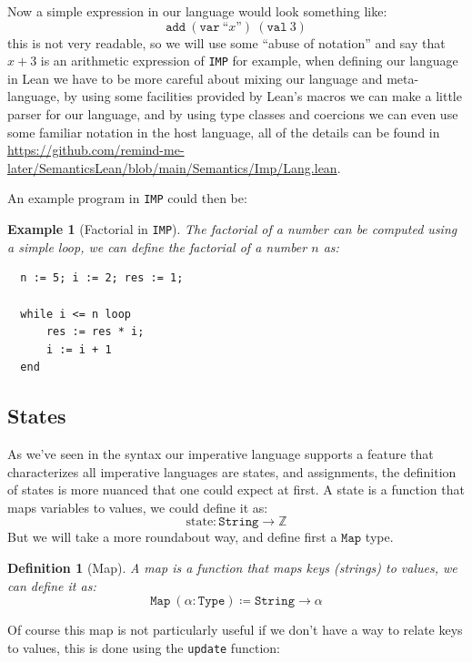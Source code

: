 \documentclass[
  a4paper, 
  10pt, 
  parskip=half, 
  DIV=20,
  toc=bibliography,
  usegeometry,
]{scrartcl}
\newtheorem{definition}[theorem]{Definition}
\newtheorem{example}[theorem]{Example}
\newcommand{\funfont}[1]{\text{#1}}
\newcommand{\tyfont}[1]{\texttt{#1}}
\begin{document}
Now a simple expression in our language would look something like:
\[
  \texttt{add} \ (\texttt{var} \ \textit{``x''}) \ (\texttt{val} \ 3)
\]
this is not very readable, so we will use some \enquote{abuse of notation} and
say that \(x + 3\) is an arithmetic expression of \texttt{IMP} for example,
when defining our language in Lean we have to be more careful about mixing
our language and meta-language, by using some facilities provided by Lean's 
macros we can make a little parser for our language, and by using type
classes and coercions we can even use some familiar notation in the host language,
all of the details can be found in 
\url{https://github.com/remind-me-later/SemanticsLean/blob/main/Semantics/Imp/Lang.lean}.

An example program in \texttt{IMP} could then be:

\begin{example}[Factorial in \texttt{IMP}]
  The factorial of a number can be computed using a simple loop, we can define
  the factorial of a number \(n\) as:
  \begin{verbatim}
  n := 5; i := 2; res := 1;

  while i <= n loop
      res := res * i;
      i := i + 1
  end
  \end{verbatim}
\end{example}

\subsection{States}

As we've seen in the syntax our imperative language supports a feature that
characterizes all imperative languages are states, and assignments, the
definition of states is more nuanced that one could expect at first. A state is
a function that maps variables to values, we could define it as:
\[
\funfont{state} : \tyfont{String} \to \mathbb{Z}
\]
But we will take a more roundabout way, and define first a \(\tyfont{Map}\)
type.

\begin{definition}[Map]
  A map is a function that maps keys (strings) to values, we can define it as:
  \[
  \tyfont{Map} \ (\alpha : \tyfont{Type}) \coloneqq \tyfont{String} \to \alpha
  \]
\end{definition}

Of course this map is not particularly useful if we don't have a way to relate
keys to values, this is done using the \texttt{update} function:
\end{document}

